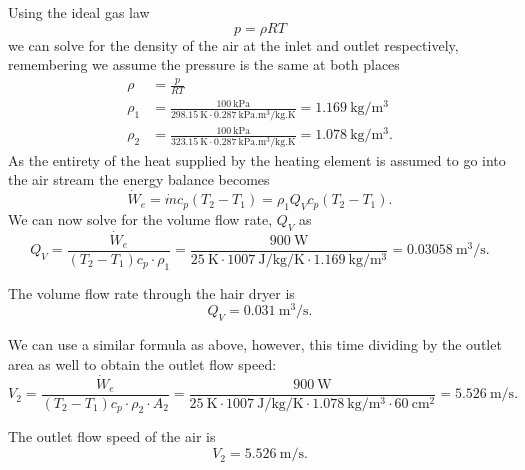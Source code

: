 \begin{derivation}

  \derivationpart

  Using the ideal gas law
  \begin{equation*}
    p = \rho R T
  \end{equation*}
  we can solve for the density of the air at the inlet and outlet respectively, remembering we assume the pressure is the same at both places
  \begin{align*}
    \rho &= \frac{p}{R T} \\
  \rho_1 &= \frac{\qty{100}{\kPa}}{\qty{298,15}{\K} \cdot \qty{0,287}{\kPa.\m\cubed\per\kg.\K}} = \qty{1,169}{\kg\per\m^3} \\
  \rho_2 &= \frac{\qty{100}{\kPa}}{\qty{323,15}{\K} \cdot \qty{0,287}{\kPa.\m\cubed\per\kg.\K} } = \qty{1,078}{\kg\per\m^3} 
  .\end{align*}
  As the entirety of the heat supplied by the heating element is assumed to go into the air stream the energy balance becomes
  \begin{equation*}
    \dot{W}_e = \dot{m} c_p (T_2 - T_1) = \rho_1 Q_{V} c_p (T_2 - T_1)
  .\end{equation*}
  We can now solve for the volume flow rate, $Q_V$ as
  \begin{equation*}
    Q_V = \frac{\dot{W}_e}{(T_2 - T_1) c_p \cdot \rho_1} = \frac{\qty{900}{\W}}{\qty{25}{\K} \cdot \qty{1007}{\J\per\kg\per\K} \cdot \qty{1,169}{\kg\per\m\cubed} } =\qty{0.03058}{\m\cubed\per\s} 
  .\end{equation*}
 
  \begin{subresult}
    The volume flow rate through the hair dryer is
    \begin{equation*}
      Q_V = \qty{0,031}{\m\cubed\per\s} 
    .\end{equation*}
  \end{subresult}

  \derivationpart

  We can use a similar formula as above, however, this time dividing by the outlet area as well to obtain the outlet flow speed:
  \begin{equation*}
    V_2 = \frac{\dot{W}_e}{(T_2 - T_1) c_p \cdot \rho_2 \cdot A_2} = \frac{\qty{900}{\W}}{\qty{25}{\K} \cdot \qty{1007}{\J\per\kg\per\K} \cdot \qty{1,078}{\kg\per\m\cubed} \cdot \qty{60}{\cm\squared} } = \qty{5,526}{\m\per\s} 
  .\end{equation*}
  \begin{subresult}
    The outlet flow speed of the air is
    \begin{equation*}
      V_2 = \qty{5,526}{\m\per\s} 
    .\end{equation*}
  \end{subresult}
\end{derivation}

